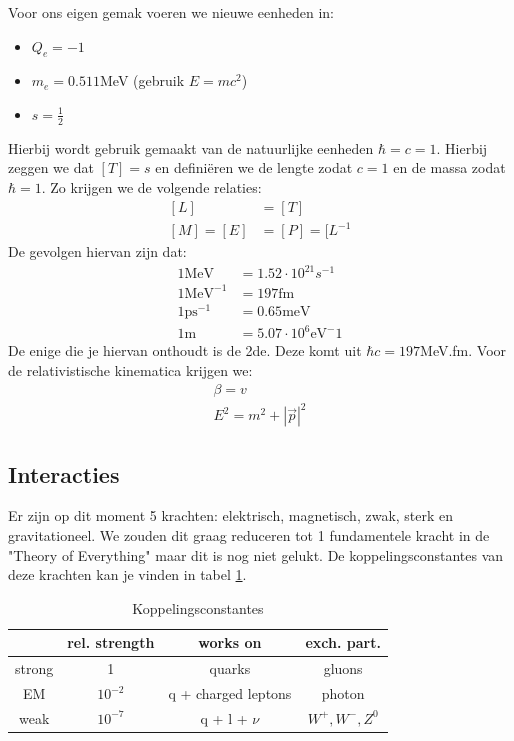\documentclass[../main.tex]{subfiles}
\begin{document}
Voor ons eigen gemak voeren we nieuwe eenheden in:
\begin{itemize}
    \item $Q_e = -1$
    \item $m_e = 0.511$MeV (gebruik $E=mc^2$)
    \item $s=\frac{1}{2}$
\end{itemize}
Hierbij wordt gebruik gemaakt van de natuurlijke eenheden $\hbar = c = 1$. Hierbij zeggen we dat $[T]=s$ en definiëren we de lengte zodat $c=1$ en de massa zodat $\hbar = 1$. Zo krijgen we de volgende relaties:
\begin{equation}
    \begin{aligned}
        \label{eq:nat_units}
        [L]&=[T]\\
        [M]=[E]&=[P]=[L^{-1}
    \end{aligned}
\end{equation}
De gevolgen hiervan zijn dat:
\begin{equation}
    \begin{aligned}
        \label{eq:nat_units_gevolgen}
        1 \text{MeV} &= 1.52 \cdot 10^{21} s^{-1}\\
        1 \text{MeV}^{-1} &= 197\text{fm}\\
        1 \text{ps}^{-1} &= 0.65 \text{meV}\\
        1 \text{m} &= 5.07\cdot 10^6 \text{eV}^-1
    \end{aligned}
\end{equation}
De enige die je hiervan onthoudt is de 2de. Deze komt uit $\hbar c = 197$MeV.fm. Voor de relativistische kinematica krijgen we:
\begin{equation}
    \begin{aligned}
        \label{eq:rel_kin}
        \beta = v\\
        E^2 = m^2 + |\vec{p}|^2
    \end{aligned}
\end{equation}

\subsection{Interacties}%
\label{sub:interacties}

Er zijn op dit moment 5 krachten: elektrisch, magnetisch, zwak, sterk en gravitationeel. We zouden dit graag reduceren tot 1 fundamentele kracht in de "Theory of Everything" maar dit is nog niet gelukt. De koppelingsconstantes van deze krachten kan je vinden in tabel \ref{tab:coupling_constants}.
\begin{table}[h]
    \centering
    \caption{Koppelingsconstantes}
    \label{tab:coupling_constants}
    \begin{tabular}{cccc}
                & rel. strength & works on              & exch. part. \\
        \hline
        strong  & 1             & quarks                & gluons \\
        EM      & $10^{-2}$     & q + charged leptons   & photon \\
        weak    & $10^{-7}$     & q + l + $\nu$         & $W^+,W^-,Z^0$
    \end{tabular}
\end{table}
\end{document}

